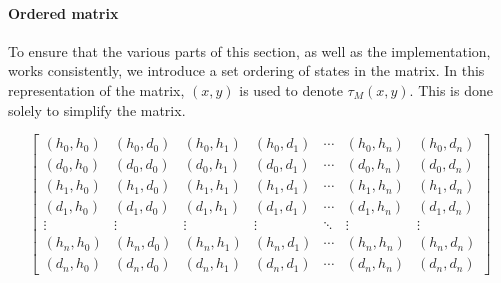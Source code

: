 \paragraph{Ordered matrix}
To ensure that the various parts of this section, as well as the implementation, works consistently, we introduce a set ordering of states in the matrix.
In this representation of the matrix, $(x, y)$ is used to denote $\tau_M(x, y)$.
This is done solely to simplify the matrix.

\begin{equation}\label{markov:matrix-ordered}
\begin{bmatrix}
(h_0, h_0) & (h_0, d_0) &
(h_0, h_1) & (h_0, d_1) &
\cdots &
(h_0, h_n) & (h_0, d_n)\\

(d_0, h_0) & (d_0, d_0) &
(d_0, h_1) & (d_0, d_1) &
\cdots &
(d_0, h_n) & (d_0, d_n)\\


(h_1, h_0) & (h_1, d_0) &
(h_1, h_1) & (h_1, d_1) &
\cdots &
(h_1, h_n) & (h_1, d_n)\\

(d_1, h_0) & (d_1, d_0) &
(d_1, h_1) & (d_1, d_1) &
\cdots &
(d_1, h_n) & (d_1, d_n)\\


\vdots & \vdots & \vdots & \vdots & \ddots & \vdots & \vdots\\


(h_n, h_0) & (h_n, d_0) &
(h_n, h_1) & (h_n, d_1) &
\cdots &
(h_n, h_n) & (h_n, d_n)\\

(d_n, h_0) & (d_n, d_0) &
(d_n, h_1) & (d_n, d_1) &
\cdots &
(d_n, h_n) & (d_n, d_n)
\end{bmatrix}
\end{equation}
